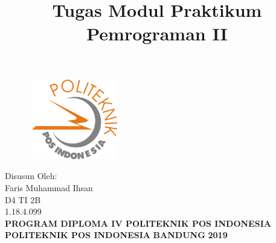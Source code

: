 \documentclass[a4paper, 12pt]{article}
\begin{document}
\title{\textbf{Tugas Modul Praktikum Pemrograman II}}
\date{}

\maketitle

\begin{figure}[!ht]
\begin{center}
\includegraphics[width = 4cm, height = 3.5cm]{gambar/logo.png}
\end{center}
\end{figure}

\begin{center}
\vspace{1cm}
Disusun Oleh:\\
Faris Muhammad Ihsan\\
D4 TI 2B\\
1.18.4.099\\
\vspace{1cm}
\textbf{PROGRAM DIPLOMA IV POLITEKNIK POS INDONESIA} \linebreak
\textbf{POLITEKNIK POS INDONESIA} \linebreak
\textbf{BANDUNG}\linebreak
\textbf{2019}

\end{center}

\thispagestyle{empty}



\end{document}
